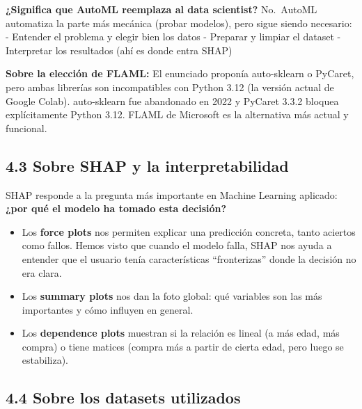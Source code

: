 \documentclass[11pt]{article}
\providecommand{\tightlist}{%
      \setlength{\itemsep}{0pt}\setlength{\parskip}{0pt}}
\begin{document}
\textbf{¿Significa que AutoML reemplaza al data scientist?} No.~AutoML
automatiza la parte más mecánica (probar modelos), pero sigue siendo
necesario: - Entender el problema y elegir bien los datos - Preparar y
limpiar el dataset - Interpretar los resultados (ahí es donde entra
SHAP)

\textbf{Sobre la elección de FLAML:} El enunciado proponía auto-sklearn
o PyCaret, pero ambas librerías son incompatibles con Python 3.12 (la
versión actual de Google Colab). auto-sklearn fue abandonado en 2022 y
PyCaret 3.3.2 bloquea explícitamente Python 3.12. FLAML de Microsoft es
la alternativa más actual y funcional.

\subsection{4.3 Sobre SHAP y la
interpretabilidad}\label{sobre-shap-y-la-interpretabilidad}

SHAP responde a la pregunta más importante en Machine Learning aplicado:
\textbf{¿por qué el modelo ha tomado esta decisión?}

\begin{itemize}
\tightlist
\item
  Los \textbf{force plots} nos permiten explicar una predicción
  concreta, tanto aciertos como fallos. Hemos visto que cuando el modelo
  falla, SHAP nos ayuda a entender que el usuario tenía características
  ``fronterizas'' donde la decisión no era clara.
\item
  Los \textbf{summary plots} nos dan la foto global: qué variables son
  las más importantes y cómo influyen en general.
\item
  Los \textbf{dependence plots} muestran si la relación es lineal (a más
  edad, más compra) o tiene matices (compra más a partir de cierta edad,
  pero luego se estabiliza).
\end{itemize}

\subsection{4.4 Sobre los datasets
utilizados}\label{sobre-los-datasets-utilizados}
\end{document}
